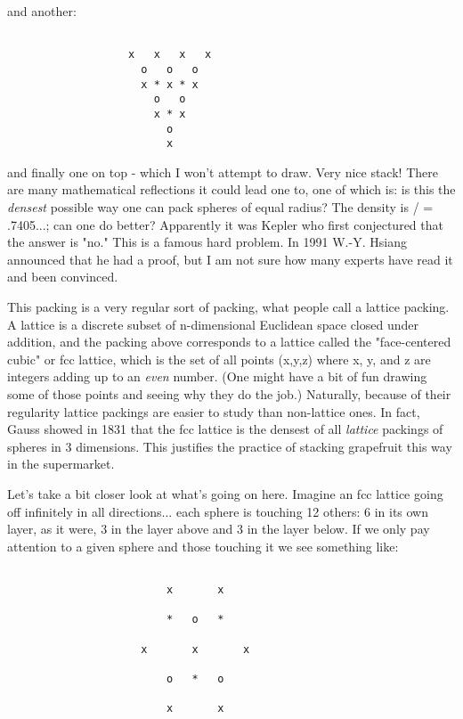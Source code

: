 and another:



\begin{verbatim}

                   x   x   x   x
                     o   o   o
                     x * x * x
                       o   o
                       x * x
                         o
                         x

\end{verbatim}
    

and finally one on top - which I won't attempt to draw.  Very nice
stack!  There are many mathematical reflections it could lead one to,
one of which is: is this the \emph{densest} possible way one can pack
spheres of equal radius?   The density is \pi / = .7405...; can one
do better?   Apparently it was Kepler who first conjectured that the
answer is "no."  This is a famous hard problem.  In 1991 W.-Y. Hsiang
announced that he had a proof, but I am not sure how many experts have
read it and been convinced.  

This packing is a very regular sort of packing, what people call a
lattice packing.  A lattice is a discrete subset of n-dimensional
Euclidean space closed under addition, and the packing above corresponds
to a lattice called the "face-centered cubic" or fcc lattice, which is
the set of all points (x,y,z) where x, y, and z are integers adding up
to an \emph{even} number.  (One might have a bit of fun drawing some of those
points and seeing why they do the job.)  Naturally, because of their
regularity lattice packings are easier to study than non-lattice ones.
In fact, Gauss showed in 1831 that the fcc lattice is the densest of all
\emph{lattice} packings of spheres in 3 dimensions.  This justifies the
practice of stacking grapefruit this way in the supermarket.

Let's take a bit closer look at what's going on here.  Imagine an fcc
lattice going off infinitely in all directions... each sphere is
touching 12 others: 6 in its own layer, as it were, 3 in the layer above
and 3 in the layer below.  If we only pay attention to a given sphere
and those touching it we see something like:



\begin{verbatim}

                         x       x   

                         *   o   * 
 
                     x       x       x

                         o   *   o

                         x       x
                         
\end{verbatim}
    
